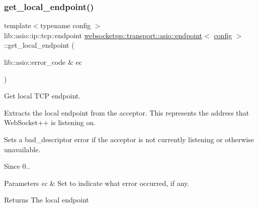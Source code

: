 \subsubsection{\texorpdfstring{get\+\_\+local\+\_\+endpoint()}{get\_local\_endpoint()}}
{\footnotesize\ttfamily template$<$typename config $>$ \\
lib\+::asio\+::ip\+::tcp\+::endpoint \mbox{\hyperlink{classwebsocketpp_1_1transport_1_1asio_1_1endpoint}{websocketpp\+::transport\+::asio\+::endpoint}}$<$ \mbox{\hyperlink{classconfig}{config}} $>$\+::get\+\_\+local\+\_\+endpoint (\begin{DoxyParamCaption}\item[{lib\+::asio\+::error\+\_\+code \&}]{ec }\end{DoxyParamCaption})\hspace{0.3cm}{\ttfamily [inline]}}



Get local T\+CP endpoint. 

Extracts the local endpoint from the acceptor. This represents the address that Web\+Socket++ is listening on.

Sets a bad\+\_\+descriptor error if the acceptor is not currently listening or otherwise unavailable.

\begin{DoxySince}{Since}
0..
\end{DoxySince}

\begin{DoxyParams}{Parameters}
{\em ec} & Set to indicate what error occurred, if any. \\
\hline
\end{DoxyParams}
\begin{DoxyReturn}{Returns}
The local endpoint 
\end{DoxyReturn}
\mbox{\label{classwebsocketpp_1_1transport_1_1asio_1_1endpoint_adf26b0ddc55fd6d223fd74be9e25d961}} 
